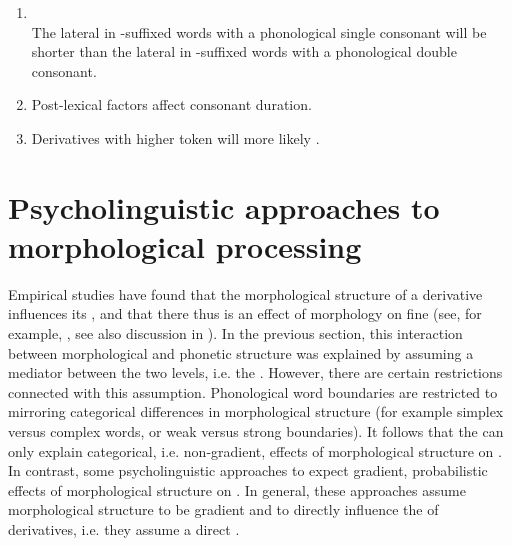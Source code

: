 \begin{enumerate}
	

	
	\item  {}  \\
	The lateral in -suffixed words with a phonological single consonant will be shorter than the lateral in -suffixed words with a phonological double consonant. 
	
	\item Post-lexical factors affect consonant duration.
	
		\item Derivatives with higher token  will more likely .
	
\end{enumerate}






\section{Psycholinguistic approaches to morphological processing} \label{Morphological Gemination: Implications for Psycholinguistic Theories of Morphological Processing}

Empirical studies have found that the morphological structure of a derivative influences its , and that there thus is an effect of morphology on fine  (see, for example, \citealt{Sproat.1993b, Cho.2001, Sugahara.2009, Pluymaekers.2010, Smith.2012, LeeKim.2013, Plag.2017}, see also discussion in ). 
In the previous section, this interaction between morphological and phonetic structure was explained by assuming a mediator between the two levels, i.e. the . However, there are certain restrictions connected with this assumption. Phonological word boundaries are restricted to mirroring categorical differences in morphological structure (for example simplex versus complex words, or weak versus strong boundaries). It follows that the  can only explain categorical, i.e. non-gradient, effects of morphological structure on . 
In contrast, some psycholinguistic approaches to  expect gradient, probabilistic effects of morphological structure on . In general, these approaches assume morphological structure to be gradient and to directly influence the  of derivatives, i.e. they assume a direct . 

